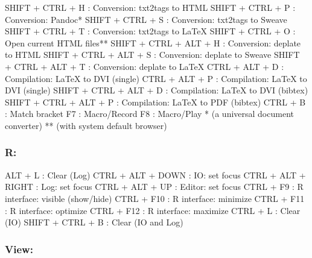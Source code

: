 \vspace{-0.5cm}
\begin{Rtables}[caption={[Tools menu keyboard shortcuts]
    ToolsMenu keyboard shortcuts},
  label=menu:tools]
  SHIFT + CTRL + H        : Conversion: txt2tags to HTML
  SHIFT + CTRL + P        : Conversion: Pandoc*
  SHIFT + CTRL + S        : Conversion: txt2tags to Sweave
  SHIFT + CTRL + T        : Conversion: txt2tags to LaTeX
  SHIFT + CTRL + O        : Open current HTML files**
  SHIFT + CTRL + ALT + H  : Conversion: deplate to HTML
  SHIFT + CTRL + ALT + S  : Conversion: deplate to Sweave
  SHIFT + CTRL + ALT + T  : Conversion: deplate to LaTeX
  CTRL  + ALT  + D        : Compilation: LaTeX to DVI (single)
  CTRL  + ALT  + P        : Compilation: LaTeX to DVI (single)
  SHIFT + CTRL + ALT + D  : Compilation: LaTeX to DVI (bibtex)
  SHIFT + CTRL + ALT + P  : Compilation: LaTeX to PDF (bibtex)
  CTRL  + B               : Match bracket
  F7                      : Macro/Record
  F8                      : Macro/Play
  *  (a universal document converter)
  ** (with system default browser)
\end{Rtables}


\subsubsection{R:}

\vspace{-0.5cm}
\begin{Rtables}[caption={[R menu keyboard shortcuts]
    R menu keyboard shortcuts},
  label=menu:r]
  ALT   + L               : Clear (Log)
  CTRL  + ALT  + DOWN     : IO: set focus
  CTRL  + ALT  + RIGHT    : Log: set focus
  CTRL  + ALT  + UP       : Editor: set focus
  CTRL  + F9              : R interface: visible (show/hide)
  CTRL  + F10             : R interface: minimize
  CTRL  + F11             : R interface: optimize
  CTRL  + F12             : R interface: maximize
  CTRL  + L               : Clear (IO)
  SHIFT + CTRL + B        : Clear (IO and Log)
\end{Rtables}


\subsubsection{View:}

